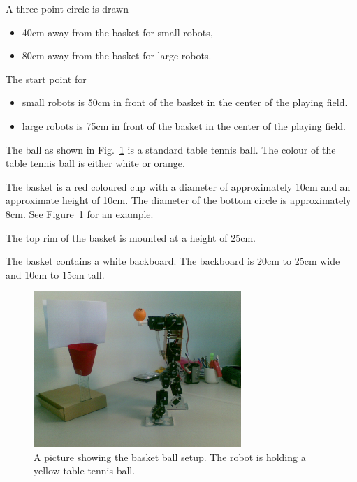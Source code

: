 \documentclass[12pt]{hurocup}
\begin{document}
\begin{lawlist}[BB]
\item A three point circle is drawn 
  \begin{itemize}
    \item 40cm away from the basket for small robots,
    \item 80cm away from the basket for large robots.
  \end{itemize}

\item The start point for
  \begin{itemize}
   \item small robots is 50cm in front of the basket in the center of
    the playing field. 
   \item large robots is 75cm in front of the basket in the center of
    the playing field.
  \end{itemize}

\end{lawlist}


\begin{lawlist}[BB]

  \item The ball as shown in Fig.~\ref{fig:basket-ball-basket} is a
  standard table tennis ball. The colour of the table tennis ball is
  either white or orange.

  \item The basket is a red coloured cup with a diameter of
  approximately 10cm and an approximate height of 10cm. The diameter
  of the bottom circle is approximately 8cm. See
  Figure~\ref{fig:basket-ball-basket} for an example.

  \item The top rim of the basket is mounted at a height of 25cm.

  \item The basket contains a white backboard. The backboard is 20cm
  to 25cm wide and 10cm to 15cm tall.

  \begin{figure}
    \begin{center}
      \includegraphics[width=0.7\textwidth]{Figures/basket-ball-basket}
    \end{center}
    \caption{A picture showing the basket ball setup. The robot is
             holding a yellow table tennis ball.}
    \label{fig:basket-ball-basket}
  \end{figure}
\end{lawlist}
\end{document}
